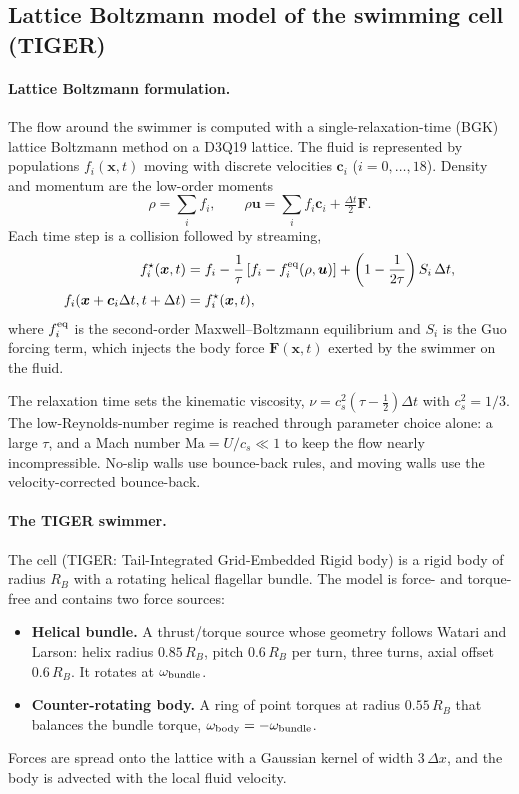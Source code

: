 \documentclass[12pt]{article}
\begin{document}
\subsection*{Lattice Boltzmann model of the swimming cell (TIGER)}
\paragraph{Lattice Boltzmann formulation.} The flow around the swimmer is computed with a single-relaxation-time (BGK) lattice Boltzmann method on a D3Q19 lattice\cite{qian1992lattice,kruger2017lbm}. The fluid is represented by populations $f_i(\bm x,t)$ moving with discrete velocities $\bm c_i$ ($i=0,\dots,18$). Density and momentum are the low-order moments
\begin{equation}
\rho=\sum_i f_i,\qquad \rho\bm u=\sum_i f_i\bm c_i+\tfrac{\Delta t}{2}\bm F .
\end{equation}
Each time step is a collision followed by streaming,
\begin{align}
f_i^{\star}(\bm x,t)&=f_i-\frac{1}{\tau}\left[f_i-f_i^{\rm eq}(\rho,\bm u)\right]+\left(1-\frac{1}{2\tau}\right)S_i\,\Delta t,\\
f_i(\bm x+\bm c_i\Delta t,t+\Delta t)&=f_i^{\star}(\bm x,t),
\end{align}
where $f_i^{\rm eq}$ is the second-order Maxwell--Boltzmann equilibrium and $S_i$ is the Guo forcing term, which injects the body force $\bm F(\bm x,t)$ exerted by the swimmer on the fluid\cite{guo2002discrete}.

The relaxation time sets the kinematic viscosity, $\nu=c_s^2(\tau-\tfrac12)\Delta t$ with $c_s^2=1/3$. The low-Reynolds-number regime is reached through parameter choice alone: a large $\tau$, and a Mach number $\mathrm{Ma}=U/c_s\ll1$ to keep the flow nearly incompressible. No-slip walls use bounce-back rules, and moving walls use the velocity-corrected bounce-back.

\paragraph{The TIGER swimmer.} The cell (TIGER: Tail-Integrated Grid-Embedded Rigid body) is a rigid body of radius $R_B$ with a rotating helical flagellar bundle. The model is force- and torque-free and contains two force sources:
\begin{itemize}\setlength\itemsep{0pt}
\item \textbf{Helical bundle.} A thrust/torque source whose geometry follows Watari and Larson\cite{watari2010hydrodynamics}: helix radius $0.85\,R_B$, pitch $0.6\,R_B$ per turn, three turns, axial offset $0.6\,R_B$. It rotates at $\omega_{\rm bundle}$.
\item \textbf{Counter-rotating body.} A ring of point torques at radius $0.55\,R_B$ that balances the bundle torque, $\omega_{\rm body}=-\omega_{\rm bundle}$.
\end{itemize}
Forces are spread onto the lattice with a Gaussian kernel of width $3\,\Delta x$, and the body is advected with the local fluid velocity.
\end{document}
